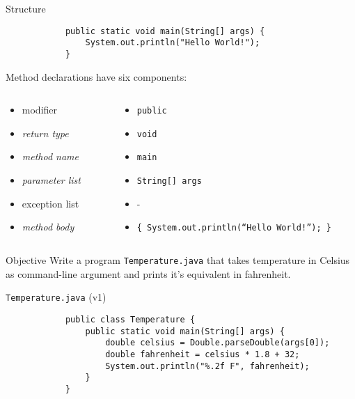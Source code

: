 \documentclass[10pt, compress]{beamer}
\begin{document}
\begin{slide}
	\begin{block}{Structure}
		\begin{verbatim}
			public static void main(String[] args) {
			    System.out.println("Hello World!");
			}
		\end{verbatim}
		Method declarations have six components:
		\begin{columns}
			\begin{column}{0.3\textwidth}
				\begin{itemize}
					\item[] modifier
					\item[] \emph{return type}
					\item[] \emph{method name}
					\item[] \emph{parameter list}
					\item[] exception list
					\item[] \emph{method body}
				\end{itemize}
			\end{column}
			\begin{column}{0.7\textwidth}
				\begin{itemize}
					\item[] \texttt{public}
					\item[] \texttt{void}
					\item[] \texttt{main}
					\item[] \texttt{String[] args}
					\item[] -
					\item[] \texttt{\footnotesize \{ System.out.println(``Hello World!''); \}}
				\end{itemize}
			\end{column}
		\end{columns}
	\end{block}
\end{slide}

\begin{slide}
	\begin{block}{Objective}
		Write a program \texttt{Temperature.java} that takes temperature in Celsius as command-line argument and prints it's equivalent in fahrenheit.
	\end{block}
\end{slide}

\begin{slide}
	\begin{block}{\texttt{Temperature.java} (v1)}
		\begin{verbatim}
			public class Temperature {
			    public static void main(String[] args) {
			        double celsius = Double.parseDouble(args[0]);
			        double fahrenheit = celsius * 1.8 + 32;
			        System.out.println("%.2f F", fahrenheit);
			    }
			}
		\end{verbatim}
	\end{block}
\end{slide}
\end{document}
